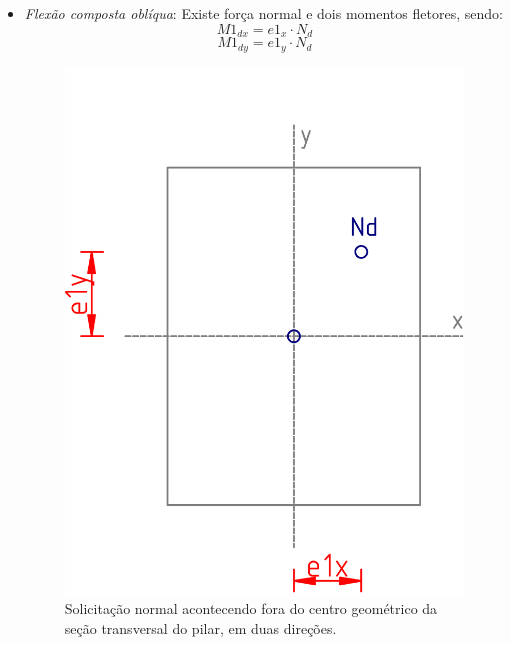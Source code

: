 \begin{itemize}
\begin{itemize}
     			\item \textit{Flexão composta oblíqua}: Existe força normal e dois momentos fletores, sendo:
				$$M1_{dx}=e1_x\cdot N_d$$
				$$M1_{dy}=e1_y\cdot N_d$$

				\begin{figure}[H]
					\begin{center}
						\caption{Solicitação normal acontecendo fora do centro geométrico da seção transversal do pilar, em duas direções.}    	
						\includegraphics[height=0.45\textwidth]{Solicitacoes-normais/Imagens/Flexao-composta-obliqua.png}
					\end{center}
				\end{figure}

  		\end{itemize}

\end{itemize}

